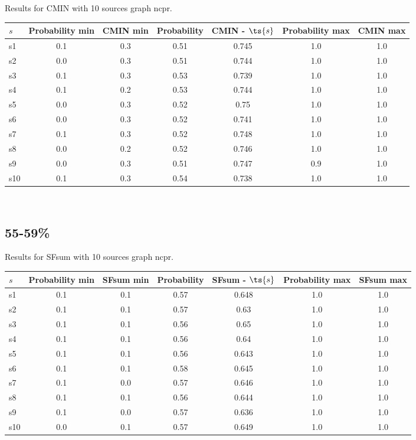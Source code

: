 \documentclass{article}
\begin{document}
\noindent Results for CMIN with 10 sources graph ncpr.

\noindent\begin{tabular}{|l|c|c|c|c|c|c|}
\hline
$s$& Probability min & CMIN min & Probability & CMIN - $\ts{s}$ & Probability max & CMIN max\\
\hline
s1 &0.1 & 0.3 & 0.51 & 0.745 & 1.0 & 1.0\\
\hline
s2 &0.0 & 0.3 & 0.51 & 0.744 & 1.0 & 1.0\\
\hline
s3 &0.1 & 0.3 & 0.53 & 0.739 & 1.0 & 1.0\\
\hline
s4 &0.1 & 0.2 & 0.53 & 0.744 & 1.0 & 1.0\\
\hline
s5 &0.0 & 0.3 & 0.52 & 0.75 & 1.0 & 1.0\\
\hline
s6 &0.0 & 0.3 & 0.52 & 0.741 & 1.0 & 1.0\\
\hline
s7 &0.1 & 0.3 & 0.52 & 0.748 & 1.0 & 1.0\\
\hline
s8 &0.0 & 0.2 & 0.52 & 0.746 & 1.0 & 1.0\\
\hline
s9 &0.0 & 0.3 & 0.51 & 0.747 & 0.9 & 1.0\\
\hline
s10 &0.1 & 0.3 & 0.54 & 0.738 & 1.0 & 1.0\\
\hline
\end{tabular}\\

\newpage

\subsection{55-59\%}

\noindent Results for SFsum with 10 sources graph ncpr.

\noindent\begin{tabular}{|l|c|c|c|c|c|c|}
\hline
$s$& Probability min & SFsum min & Probability & SFsum - $\ts{s}$ & Probability max & SFsum max\\
\hline
s1 &0.1 & 0.1 & 0.57 & 0.648 & 1.0 & 1.0\\
\hline
s2 &0.1 & 0.1 & 0.57 & 0.63 & 1.0 & 1.0\\
\hline
s3 &0.1 & 0.1 & 0.56 & 0.65 & 1.0 & 1.0\\
\hline
s4 &0.1 & 0.1 & 0.56 & 0.64 & 1.0 & 1.0\\
\hline
s5 &0.1 & 0.1 & 0.56 & 0.643 & 1.0 & 1.0\\
\hline
s6 &0.1 & 0.1 & 0.58 & 0.645 & 1.0 & 1.0\\
\hline
s7 &0.1 & 0.0 & 0.57 & 0.646 & 1.0 & 1.0\\
\hline
s8 &0.1 & 0.1 & 0.56 & 0.644 & 1.0 & 1.0\\
\hline
s9 &0.1 & 0.0 & 0.57 & 0.636 & 1.0 & 1.0\\
\hline
s10 &0.0 & 0.1 & 0.57 & 0.649 & 1.0 & 1.0\\
\hline
\end{tabular}\\
\end{document}
